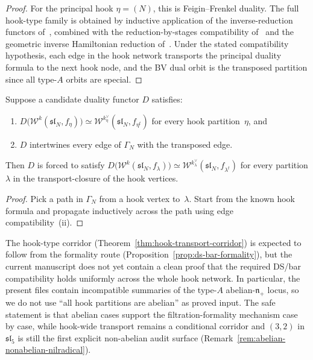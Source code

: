 \begin{proof}
For the principal hook $\eta = (N)$, this is Feigin--Frenkel
duality.  The full hook-type family is obtained by inductive
application of the inverse-reduction functors
of~\cite{FehilyHook}, combined with the reduction-by-stages
compatibility of~\cite{GenraStages} and the geometric inverse
Hamiltonian reduction of~\cite{ButsonNair}.  Under the stated
compatibility hypothesis, each edge in the hook network transports
the principal duality formula to the next hook node, and the BV dual
orbit is the transposed partition since all type-$A$ orbits are
special.
\end{proof}

\begin{proposition}
\label{prop:transport-propagation}
Suppose a candidate duality functor $D$ satisfies:
\begin{enumerate}[label=\textup{(\roman*)}]
\item $D\bigl(\mathcal{W}^k(\mathfrak{sl}_N, f_\eta)\bigr)
  \simeq \mathcal{W}^{k_\eta^\vee}(\mathfrak{sl}_N, f_{\eta^t})$
  for every hook partition~$\eta$, and
\item $D$ intertwines every edge of $\Gamma_N$ with the
  transposed edge.
\end{enumerate}
Then $D$ is forced to satisfy
$D\bigl(\mathcal{W}^k(\mathfrak{sl}_N, f_\lambda)\bigr)
\simeq \mathcal{W}^{k_\lambda^\vee}(\mathfrak{sl}_N, f_{\lambda^t})$
for every partition $\lambda$ in the transport-closure of the
hook vertices.
\end{proposition}

\begin{proof}
Pick a path in $\Gamma_N$ from a hook vertex to~$\lambda$.
Start from the known hook formula and propagate inductively across
the path using edge compatibility~(ii).
\end{proof}

\begin{remark}
\label{rem:hook-formality-mechanism}
The hook-type corridor (Theorem~\ref{thm:hook-transport-corridor})
is expected to follow from the formality route
(Proposition~\ref{prop:ds-bar-formality}), but the current manuscript
does not yet contain a clean proof that the required DS/bar
compatibility holds uniformly across the whole hook network.  In
particular, the present files contain incompatible summaries of the
type-$A$ abelian-$\mathfrak{n}_+$ locus, so we do not use
``all hook partitions are abelian'' as proved input.  The safe
statement is that abelian cases support the filtration-formality
mechanism case by case, while hook-wide transport remains a
conditional corridor and $(3,2)$ in $\mathfrak{sl}_5$ is still the
first explicit non-abelian audit surface
(Remark~\ref{rem:abelian-nonabelian-nilradical}).
\end{remark}

